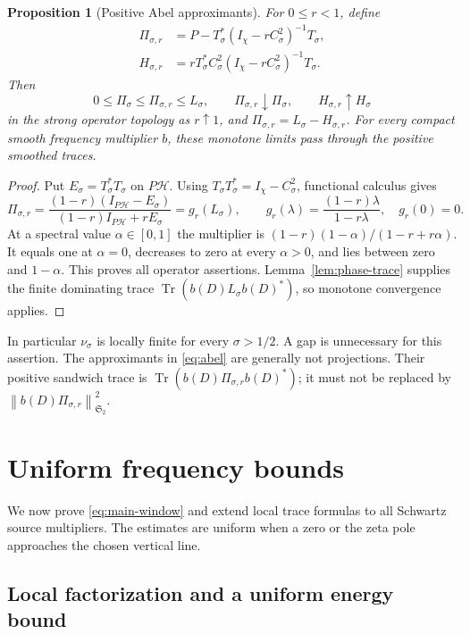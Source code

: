 \documentclass[11pt]{article}
\numberwithin{equation}{section}
\newtheorem{proposition}[theorem]{Proposition}
\theoremstyle{definition}
\theoremstyle{remark}
\newcommand{\HH}{\mathcal H}
\newcommand{\Tr}{\operatorname{Tr}}
\newcommand{\Id}{I}
\newcommand{\Stwo}{\mathfrak S_2}
\newcommand{\norm}[1]{\left\lVert #1\right\rVert}
\begin{document}
\begin{proposition}[Positive Abel approximants]\label{prop:abel}
For \(0\le r<1\), define
\begin{align}
\Pi_{\sigma,r}
&=P-T_\sigma^*(\Id_\chi-rC_\sigma^2)^{-1}T_\sigma,\label{eq:abel}\\
H_{\sigma,r}
&=rT_\sigma^*C_\sigma^2(\Id_\chi-rC_\sigma^2)^{-1}T_\sigma.
\label{eq:abel-return}
\end{align}
Then
\[
0\le\Pi_\sigma\le\Pi_{\sigma,r}\le L_\sigma,\qquad
\Pi_{\sigma,r}\downarrow\Pi_\sigma,\qquad
H_{\sigma,r}\uparrow H_\sigma
\]
in the strong operator topology as \(r\uparrow1\), and
\(\Pi_{\sigma,r}=L_\sigma-H_{\sigma,r}\).
For every compact smooth frequency multiplier \(b\), these monotone
limits pass through the positive smoothed traces.
\end{proposition}
\begin{proof}
Put \(E_\sigma=T_\sigma^*T_\sigma\) on \(P\HH\).
Using \(T_\sigma T_\sigma^*=\Id_\chi-C_\sigma^2\),
functional calculus gives
\[
\Pi_{\sigma,r}
=\frac{(1-r)(\Id_{P\HH}-E_\sigma)}
{(1-r)\Id_{P\HH}+rE_\sigma}
=g_r(L_\sigma),\qquad
g_r(\lambda)=\frac{(1-r)\lambda}{1-r\lambda},
\quad g_r(0)=0.
\]
At a spectral value \(\alpha\in[0,1]\) the multiplier is
\((1-r)(1-\alpha)/(1-r+r\alpha)\). It equals one at
\(\alpha=0\), decreases to zero at every \(\alpha>0\), and lies
between zero and \(1-\alpha\). This proves all operator assertions.
Lemma~\ref{lem:phase-trace} supplies the finite dominating trace
\(\Tr(b(D)L_\sigma b(D)^*)\), so monotone convergence applies.
\end{proof}

In particular \(\nu_\sigma\) is locally finite for every
\(\sigma>1/2\). A gap is unnecessary for this assertion.
The approximants in \eqref{eq:abel} are generally not projections.
Their positive sandwich trace is
\(\Tr(b(D)\Pi_{\sigma,r}b(D)^*)\); it must not be replaced by
\(\norm{b(D)\Pi_{\sigma,r}}_{\Stwo}^2\).

\section{Uniform frequency bounds}\label{sec:tails}

We now prove \eqref{eq:main-window} and extend local trace formulas to
all Schwartz source multipliers. The estimates are uniform when a zero
or the zeta pole approaches the chosen vertical line.

\subsection{Local factorization and a uniform energy bound}
\end{document}
